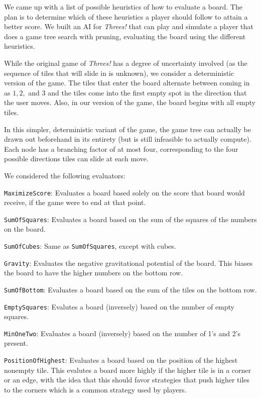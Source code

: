 \documentclass[11pt]{article}
\begin{document}
We came up with a list of possible heuristics of how to evaluate a board. The plan is to determine which of these heuristics a player should follow to attain a better score. We built an AI for \emph{Threes!} that can play and simulate a player that does a game tree search with pruning, evaluating the board using the different heuristics. 

While the original game of \emph{Threes!} has a degree of uncertainty involved (as the sequence of tiles that will slide in is unknown), we consider a deterministic version of the game. The tiles that enter the board alternate between coming in as $1, 2,$ and $3$ and the tiles come into the first empty spot in the direction that the user moves. Also, in our version of the game, the board begins with all empty tiles.

In this simpler, deterministic variant of the game, the game tree can actually be drawn out beforehand in its entirety (but is still infeasible to actually compute). Each node has a branching factor of at most four, corresponding to the four possible directions tiles can slide at each move.

We considered the following evaluators:

\texttt{MaximizeScore}: Evaluates a board based solely on the score that board would receive, if the game were to end at that point.

\texttt{SumOfSquares}: Evaluates a board based on the sum of the squares of the numbers on the board.

\texttt{SumOfCubes}: Same as \texttt{SumOfSquares}, except with cubes.

\texttt{Gravity}: Evaluates the negative gravitational potential of the board. This biases the board to have the higher numbers on the bottom row.

\texttt{SumOfBottom}: Evaluates a board based on the sum of the tiles on the bottom row.

\texttt{EmptySquares}: Evalutes a board (inversely) based on the number of empty squares.

\texttt{MinOneTwo}: Evaluates a board (inversely) based on the number of 1's and 2's present. 

\texttt{PositionOfHighest}: Evaluates a board based on the position of the highest nonempty tile. This evalutes a board more highly if the higher tile is in a corner or an edge, with the idea that this should favor strategies that push higher tiles to the corners which is a common strategy used by players. 
\end{document}
